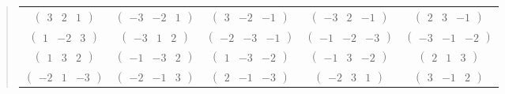 \documentclass[fleqn,9pt,landscape]{jsarticle}
\begin{document}
\begin{quote}
\begin{tabular}{ccccc}
$ \begin{pmatrix} 3 & 2 & 1 \end{pmatrix} $ & $ \begin{pmatrix} -3 & -2 & 1 \end{pmatrix} $ & $ \begin{pmatrix} 3 & -2 & -1 \end{pmatrix} $ & $ \begin{pmatrix} -3 & 2 & -1 \end{pmatrix} $ & $ \begin{pmatrix} 2 & 3 & -1 \end{pmatrix} $ \\
$ \begin{pmatrix} 1 & -2 & 3 \end{pmatrix} $ & $ \begin{pmatrix} -3 & 1 & 2 \end{pmatrix} $ & $ \begin{pmatrix} -2 & -3 & -1 \end{pmatrix} $ & $ \begin{pmatrix} -1 & -2 & -3 \end{pmatrix} $ & $ \begin{pmatrix} -3 & -1 & -2 \end{pmatrix} $ \\
$ \begin{pmatrix} 1 & 3 & 2 \end{pmatrix} $ & $ \begin{pmatrix} -1 & -3 & 2 \end{pmatrix} $ & $ \begin{pmatrix} 1 & -3 & -2 \end{pmatrix} $ & $ \begin{pmatrix} -1 & 3 & -2 \end{pmatrix} $ & $ \begin{pmatrix} 2 & 1 & 3 \end{pmatrix} $ \\
$ \begin{pmatrix} -2 & 1 & -3 \end{pmatrix} $ & $ \begin{pmatrix} -2 & -1 & 3 \end{pmatrix} $ & $ \begin{pmatrix} 2 & -1 & -3 \end{pmatrix} $ & $ \begin{pmatrix} -2 & 3 & 1 \end{pmatrix} $ & $ \begin{pmatrix} 3 & -1 & 2 \end{pmatrix} $ \\

\end{tabular}
\end{quote}
\end{document}

